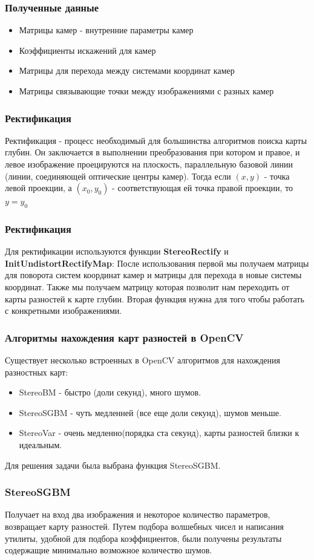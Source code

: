 \documentclass{beamer}
\begin{document}
		\begin{frame}
			\frametitle{Полученные данные}
			\begin{itemize}
				\item Матрицы камер - внутренние параметры камер
				\item Коэффициенты искажений для камер
				\item Матрицы для перехода между системами координат камер
				\item Матрицы связывающие точки между изображениями с разных камер
			\end{itemize}
		\end{frame}
		\begin{frame}
			\frametitle{Ректификация}
			Ректификация - процесс необходимый для большинства алгоритмов поиска карты глубин. Он заключается в выполнении преобразования при котором и правое, и левое изображение проецируются на плоскость, параллельную базовой линии (линии, соединяющей оптические центры камер). Тогда если $(x, y)$ - точка левой проекции, а $(x_{0},y_{0})$ - соответствующая ей точка правой проекции, то $y = y_{0}$
		\end{frame}
		\begin{frame}
			\frametitle{Ректификация}
			Для ректификации используются функции \textbf{StereoRectify} и \textbf{InitUndistortRectifyMap}: После использования первой мы получаем матрицы для поворота систем координат камер и матрицы для перехода в новые системы координат. Также мы получаем матрицу которая позволит нам переходить от карты разностей к карте глубин. Вторая функция нужна для того чтобы работать с конкретными изображениями.
		\end{frame}
		\begin{frame}
			\frametitle{Алгоритмы нахождения карт разностей в OpenCV}
			Существует несколько встроенных в OpenCV алгоритмов для нахождения разностных карт:
			\begin{itemize}
				\item StereoBM - быстро (доли секунд), много шумов.
				\item StereoSGBM - чуть медленней (все еще доли секунд), шумов меньше.
				\item StereoVar - очень медленно(порядка ста секунд), карты разностей близки к идеальным.
			\end{itemize}	
			Для решения задачи была выбрана функция StereoSGBM.
		\end{frame}
		\begin{frame}
			\frametitle{StereoSGBM}
			Получает на вход два изображения и некоторое количество параметров, возвращает карту разностей. Путем подбора волшебных чисел и написания утилиты, удобной для подбора коэффициентов, были получены результаты содержащие минимально возможное количество шумов.
		\end{frame}
\end{document}
